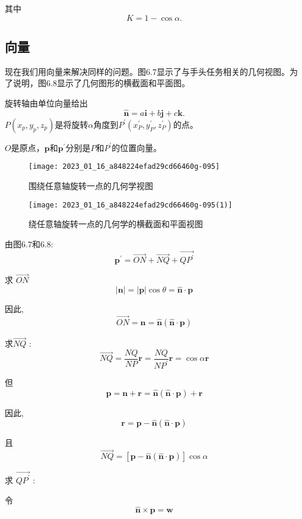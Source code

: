 其中
$$
K=1-\cos \alpha .
$$






\subsection{向量}
现在我们用向量来解决同样的问题。图$6.7$显示了与手头任务相关的几何视图。为了说明，图6.8显示了几何图形的横截面和平面图。

旋转轴由单位向量给出
$$
\hat{\mathbf{n}}=a \mathbf{i}+b \mathbf{j}+c \mathbf{k} .
$$
$P\left(x_{p}, y_{p}, z_{p}\right)$是将旋转$\alpha$角度到$P^{\prime}\left(x_{P}^{\prime}, y_{P}^{\prime}, z_{P}^{\prime}\right)$的点。

$O$是原点，$\mathbf{p}$和$\mathbf{p}^{\prime}$分别是$ P $和$ P ^{\prime}$的位置向量。
\begin{figure}[h!]
    \centering
    \texttt{[image: 2023\_01\_16\_a848224efad29cd66460g-095]}
    \caption[short]{围绕任意轴旋转一点的几何学视图}
\end{figure}
\begin{figure}[h!]
    \centering
    \texttt{[image: 2023\_01\_16\_a848224efad29cd66460g-095(1)]}
    \caption[short]{绕任意轴旋转一点的几何学的横截面和平面视图}
\end{figure}

由图$6.7$和$6.8$:
$$
\mathbf{p}^{\prime}=\overrightarrow{O N}+\overrightarrow{N Q}+\overrightarrow{Q P^{\prime}}
$$

求 $\overrightarrow{O N}$
$$
|\mathbf{n}|=|\mathbf{p}| \cos \theta=\hat{\mathbf{n}} \cdot \mathbf{p}
$$

因此,
$$
\overrightarrow{O N}=\mathbf{n}=\hat{\mathbf{n}}(\hat{\mathbf{n}} \cdot \mathbf{p})
$$

求$\overrightarrow{N Q}$ :
$$
\overrightarrow{N Q}=\frac{N Q}{N P} \mathbf{r}=\frac{N Q}{N P^{\prime}} \mathbf{r}=\cos \alpha \mathbf{r}
$$

但
$$
\mathbf{p}=\mathbf{n}+\mathbf{r}=\hat{\mathbf{n}}(\hat{\mathbf{n}} \cdot \mathbf{p})+\mathbf{r}
$$

因此,
$$
\mathbf{r}=\mathbf{p}-\hat{\mathbf{n}}(\hat{\mathbf{n}} \cdot \mathbf{p})
$$

且
$$
\overrightarrow{N Q}=[\mathbf{p}-\hat{\mathbf{n}}(\hat{\mathbf{n}} \cdot \mathbf{p})] \cos \alpha
$$

求 $\overrightarrow{Q P^{\prime}}$ :

令
$$
\hat{\mathbf{n}} \times \mathbf{p}=\mathbf{w}
$$

